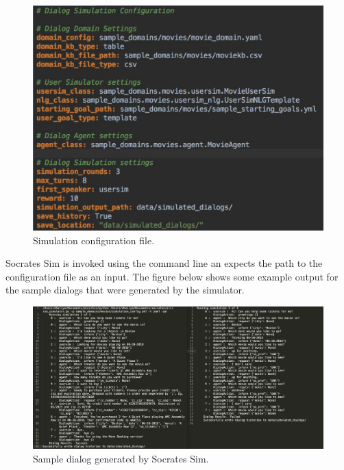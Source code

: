 \begin{figure}[h!]
	\centering
	\includegraphics[scale=.3]{diagrams/movie_sim_config.jpeg}
	\caption{ Simulation configuration file. }
	\label{fig:movie_sim_config }
\end{figure}

\clearpage

Socrates Sim is invoked using the command line an expects the path to the configuration file as an input. The figure below shows some example output for the sample dialogs that were generated by the simulator.

\begin{figure}[h!]
	\centering
	\includegraphics[scale=.15]{diagrams/movie_output.jpeg}
	\caption{ Sample dialog generated by Socrates Sim.}
	\label{fig:movie_output}
\end{figure}




